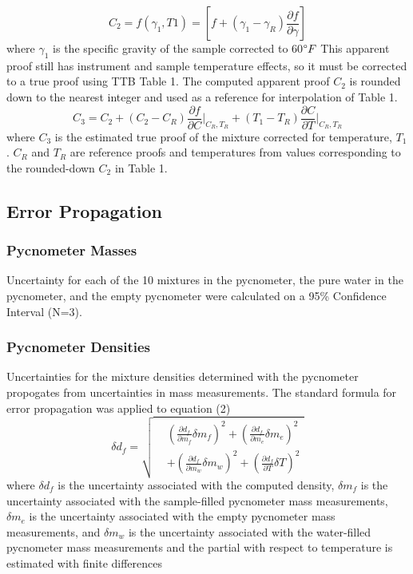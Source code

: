 \documentclass[lettersize,journal]{IEEEtran}
\begin{document}
	\begin{equation}
		\label{deqn_ex4}
		C_{2} = f(\gamma_{1},T1) = [f + (\gamma_{1}-\gamma_{R})\frac{\partial f}{\partial \gamma} ] 
	\end{equation}
	where $\gamma_{1}$ is the specific gravity of the sample corrected to 60$\degree F$
	This apparent proof still has instrument and sample temperature effects, so it must be corrected to a true proof using TTB Table 1. The computed apparent proof $C_{2}$ is rounded down to the nearest integer and used as a reference for interpolation of Table 1.
	\begin{equation}
		\label{deqn_ex5}
		C_3 = C_2 + (C_2 - C_R) \frac{\partial f}{\partial C}\bigg|_{C_R, T_R} + (T_1 - T_R) \frac{\partial C}{\partial T}\bigg|_{C_R, T_R}
	\end{equation}
	where $C_{3}$ is the estimated true proof of the mixture corrected for temperature, $T_{1}$. $C_{R}$ and $T_{R}$ are reference proofs and temperatures from values corresponding to the rounded-down $C_{2}$ in Table 1.
	
	\subsection{Error Propagation}
	\subsubsection{Pycnometer Masses}
	 Uncertainty for each of the 10 mixtures in the pycnometer, the pure water in the pycnometer, and the empty pycnometer were calculated on a 95\% Confidence Interval (N=3). 
	\subsubsection{Pycnometer Densities}
	Uncertainties for the mixture densities determined with the pycnometer propogates from uncertainties in mass measurements. The standard formula for error propagation was applied to equation (2)
	\begin{equation}
		\label{deqn_ex6}
		\delta d_{f} = \sqrt{
			\begin{aligned}
				&\left(\frac{\partial d_{f}}{\partial m_{f}}\delta m_{f}\right)^2 + 
				\left(\frac{\partial d_{f}}{\partial m_{e}}\delta m_{e}\right)^2 \\
				&+ \left(\frac{\partial d_{f}}{\partial m_{w}}\delta m_{w}\right)^2 + 
				\left(\frac{\partial d_{f}}{\partial T}\delta T\right)^2
			\end{aligned}
		}
	\end{equation}
	where $\delta d_{f}$ is the uncertainty associated with the computed density, $\delta m_{f}$ is the uncertainty associated with the sample-filled pycnometer mass measurements, $\delta m_{e}$ is the uncertainty associated with the empty pycnometer mass measurements, and $\delta m_{w}$ is the uncertainty associated with the water-filled pycnometer mass measurements and the partial with respect to temperature is estimated with finite differences  
\end{document}

